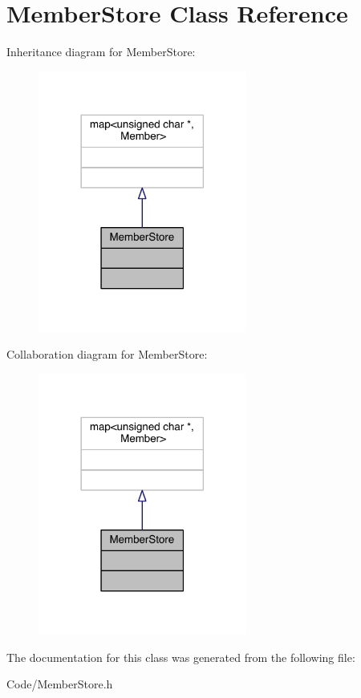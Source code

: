 \hypertarget{class_member_store}{\section{Member\-Store Class Reference}
\label{class_member_store}
}


Inheritance diagram for Member\-Store\-:\nopagebreak
\begin{figure}[H]
\begin{center}
\leavevmode
\includegraphics[width=194pt]{class_member_store__inherit__graph}
\end{center}
\end{figure}


Collaboration diagram for Member\-Store\-:\nopagebreak
\begin{figure}[H]
\begin{center}
\leavevmode
\includegraphics[width=194pt]{class_member_store__coll__graph}
\end{center}
\end{figure}


The documentation for this class was generated from the following file\-:\begin{DoxyCompactItemize}
\item 
Code/Member\-Store.\-h\end{DoxyCompactItemize}
